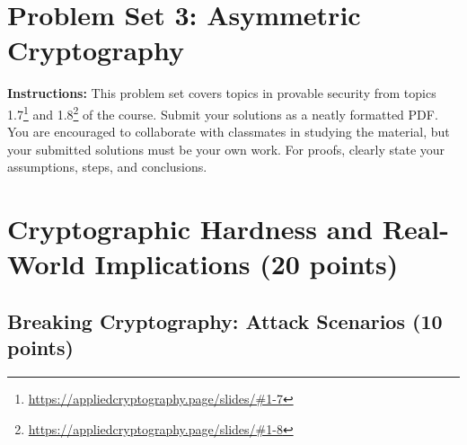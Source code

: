 \documentclass[10pt,a4paper,american]{article}
\begin{document}
\classhandoutheader

\section*{Problem Set 3: Asymmetric Cryptography}

\begin{tcolorbox}[colframe=OliveGreen!30!white,colback=OliveGreen!5!white]
	\textbf{Instructions:} This problem set covers topics in provable security from topics 1.7\footnote{\url{https://appliedcryptography.page/slides/\#1-7}} and 1.8\footnote{\url{https://appliedcryptography.page/slides/\#1-8}} of the course. Submit your solutions as a neatly formatted PDF. You are encouraged to collaborate with classmates in studying the material, but your submitted solutions must be your own work. For proofs, clearly state your assumptions, steps, and conclusions.
\end{tcolorbox}

\section{Cryptographic Hardness and Real-World Implications (20 points)}

\subsection{Breaking Cryptography: Attack Scenarios (10 points)}
\end{document}
